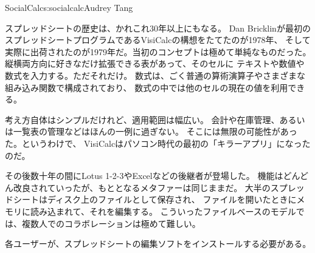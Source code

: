 \begin{aosachapter}{SocialCalc}{s:socialcalc}{Audrey Tang}

スプレッドシートの歴史は、かれこれ30年以上にもなる。
Dan Bricklinが最初のスプレッドシートプログラムであるVisiCalcの構想をたてたのが1978年、
そして実際に出荷されたのが1979年だ。当初のコンセプトは極めて単純なものだった。
縦横両方向に好きなだけ拡張できる表があって、そのセルに
テキストや数値や数式を入力する。ただそれだけ。
数式は、ごく普通の算術演算子やさまざまな組み込み関数で構成されており、
数式の中では他のセルの現在の値を利用できる。

考え方自体はシンプルだけれど、適用範囲は幅広い。
会計や在庫管理、あるいは一覧表の管理などはほんの一例に過ぎない。
そこには無限の可能性があった。というわけで、
VisiCalcはパソコン時代の最初の「キラーアプリ」になったのだ。

その後数十年の間にLotus 1-2-3やExcelなどの後継者が登場した。
機能はどんどん改良されていったが、もととなるメタファーは同じままだ。
大半のスプレッドシートはディスク上のファイルとして保存され、
ファイルを開いたときにメモリに読み込まれて、それを編集する。
こういったファイルベースのモデルでは、複数人でのコラボレーションは極めて難しい。

\begin{aosaitemize}

  \item 各ユーザーが、スプレッドシートの編集ソフトをインストールする必要がある。


\end{aosaitemize}
\end{aosachapter}
